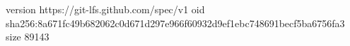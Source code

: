 version https://git-lfs.github.com/spec/v1
oid sha256:8a671fc49b682062c0d671d297e966f60932d9ef1ebc748691becf5ba6756fa3
size 89143
